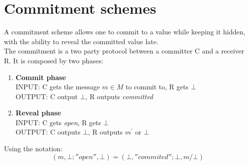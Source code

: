 \documentclass{article}
\begin{document}
\newpage

\section{Commitment schemes}
A commitment scheme allows one to commit to a value while keeping it hidden, with the ability to reveal the committed value late.\\
The commitment is a two party protocol between a committer C and a receiver R. It is composed by two phases:
\begin{enumerate}
\item \textbf{Commit phase}\\
INPUT: C gets the message $m \in M$ to commit to, R gets $\bot$\\
OUTPUT: C output $\bot$, R outputs \textit{committed}
\item \textbf{Reveal phase}\\
INPUT: C gets \textit{open}, R gets $\bot$\\
OUTPUT: C outputs $\bot$, R outputs $m^{'}$ or $\bot$
\end{enumerate}
Using the notation:
\begin{equation}
[C,R](m,\bot;''open '',\bot) = (\bot,''commited '';\bot,m/\bot)
\end{equation}
\end{document}
